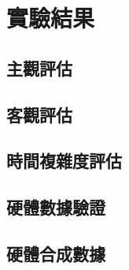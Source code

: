 \chapter{實驗結果} \label{chapter:evaluation}



\section{主觀評估}
\section{客觀評估}
\section{時間複雜度評估}
\section{硬體數據驗證}
\section{硬體合成數據}
